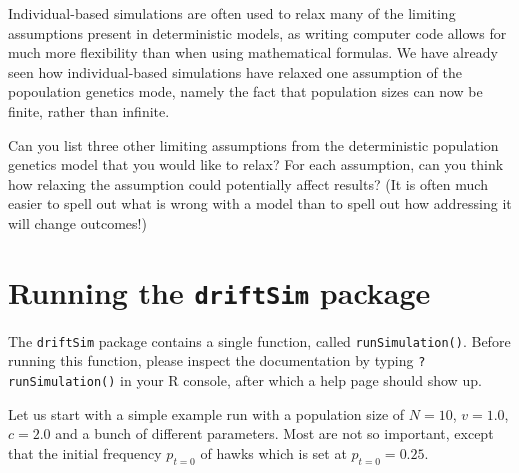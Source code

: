 \documentclass[
]{book}
\begin{document}
Individual-based simulations are often used to relax many of the limiting assumptions present in deterministic models, as writing computer code allows for much more flexibility than when using mathematical formulas. We have already seen how individual-based simulations have relaxed one assumption of the popoulation genetics mode, namely the fact that population sizes can now be finite, rather than infinite.

Can you list three other limiting assumptions from the deterministic population genetics model that you would like to relax? For each assumption, can you think how relaxing the assumption could potentially affect results? (It is often much easier to spell out what is wrong with a model than to spell out how addressing it will change outcomes!)

\hypertarget{running-the-driftsim-package}{%
\section{\texorpdfstring{Running the \texttt{driftSim} package}{Running the driftSim package}}\label{running-the-driftsim-package}}

The \texttt{driftSim} package contains a single function, called \texttt{runSimulation()}. Before running this function, please inspect the documentation by typing \texttt{?runSimulation()} in your R console, after which a help page should show up.

Let us start with a simple example run with a population size of \(N=10\), \(v=1.0\), \(c=2.0\) and a bunch of different parameters. Most are not so important, except that the initial frequency \(p_{t=0}\) of hawks which is set at \(p_{t=0} = 0.25\).
\end{document}
